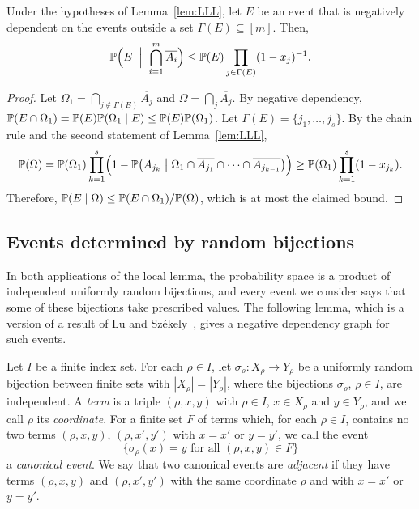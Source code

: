 \begin{lemma}\label{lem:cond}
Under the hypotheses of Lemma~\ref{lem:LLL}, let $E$ be an event that is negatively dependent on the events outside a set $\Gamma(E)\subseteq [m]$. Then,
\[\mathbb{P}\Bigl(E\;\Bigm|\;\bigcap_{i=1}^m\overline{A_i}\Bigr)\le\mathbb{P}(E)\prod_{j\in\Gamma(E)}(1-x_j)^{-1}.\]
\end{lemma}
\begin{proof}
Let $\Omega_1=\bigcap_{j\notin\Gamma(E)}\overline{A_j}$ and $\Omega=\bigcap_j\overline{A_j}$. By negative dependency, $\mathbb{P}(E\cap\Omega_1)=\mathbb{P}(E)\mathbb{P}(\Omega_1\mid E)\le\mathbb{P}(E)\mathbb{P}(\Omega_1)$. Let $\Gamma(E)=\{j_1,\dots,j_s\}$. By the chain rule and the second statement of Lemma~\ref{lem:LLL},
\[\mathbb{P}(\Omega)=\mathbb{P}(\Omega_1)\prod_{k=1}^{s}\Bigl(1-\mathbb{P}\bigl(A_{j_k}\bigm|\Omega_1\cap\overline{A_{j_1}}\cap\dots\cap\overline{A_{j_{k-1}}}\bigr)\Bigr)\ge\mathbb{P}(\Omega_1)\prod_{k=1}^s(1-x_{j_k}).\]
Therefore, $\mathbb{P}(E\mid\Omega)\le\mathbb{P}(E\cap\Omega_1)/\mathbb{P}(\Omega)$, which is at most the claimed bound.
\end{proof}

\subsection{Events determined by random bijections}\label{sec:bijections}
In both applications of the local lemma, the probability space is a product of independent uniformly random bijections, and every event we consider says that some of these bijections take prescribed values.
The following lemma, which is a version of a result of Lu and Sz\'ekely~\cite{LS}, gives a negative dependency graph for such events.

Let $I$ be a finite index set. For each $\rho\in I$, let $\sigma_\rho:X_\rho\to Y_\rho$ be a uniformly random bijection between finite sets with $|X_\rho|=|Y_\rho|$, where the bijections $\sigma_\rho$, $\rho\in I$, are independent.
A \emph{term} is a triple $(\rho,x,y)$ with $\rho\in I$, $x\in X_\rho$ and $y\in Y_\rho$, and we call $\rho$ its \emph{coordinate}.
For a finite set $F$ of terms which, for each $\rho\in I$, contains no two terms $(\rho,x,y)$, $(\rho,x',y')$ with $x=x'$ or $y=y'$, we call the event
\[
\{\sigma_\rho(x)=y\text{ for all }(\rho,x,y)\in F\}
\]
a \emph{canonical event}. We say that two canonical events are \emph{adjacent} if they have terms $(\rho,x,y)$ and $(\rho,x',y')$ with the same coordinate $\rho$ and with $x=x'$ or $y=y'$.

